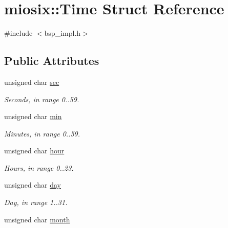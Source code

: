 \hypertarget{structmiosix_1_1_time}{\section{miosix\-:\-:Time Struct Reference}
\label{structmiosix_1_1_time}
}


{\ttfamily \#include $<$bsp\-\_\-impl.\-h$>$}

\subsection*{Public Attributes}
\begin{DoxyCompactItemize}
\item 
\hypertarget{structmiosix_1_1_time_a04df8f20000785df381311586aa3c3f1}{unsigned char \hyperlink{structmiosix_1_1_time_a04df8f20000785df381311586aa3c3f1}{sec}}\label{structmiosix_1_1_time_a04df8f20000785df381311586aa3c3f1}

\begin{DoxyCompactList}\small\item\em Seconds, in range 0..59. \end{DoxyCompactList}\item 
\hypertarget{structmiosix_1_1_time_a42a4aa9118e73cdc73685919e73a4299}{unsigned char \hyperlink{structmiosix_1_1_time_a42a4aa9118e73cdc73685919e73a4299}{min}}\label{structmiosix_1_1_time_a42a4aa9118e73cdc73685919e73a4299}

\begin{DoxyCompactList}\small\item\em Minutes, in range 0..59. \end{DoxyCompactList}\item 
\hypertarget{structmiosix_1_1_time_abf699a0aa658d1595f181420c88014ae}{unsigned char \hyperlink{structmiosix_1_1_time_abf699a0aa658d1595f181420c88014ae}{hour}}\label{structmiosix_1_1_time_abf699a0aa658d1595f181420c88014ae}

\begin{DoxyCompactList}\small\item\em Hours, in range 0..23. \end{DoxyCompactList}\item 
\hypertarget{structmiosix_1_1_time_a1876747788d5cc51d9e9b6e5c7cce14b}{unsigned char \hyperlink{structmiosix_1_1_time_a1876747788d5cc51d9e9b6e5c7cce14b}{day}}\label{structmiosix_1_1_time_a1876747788d5cc51d9e9b6e5c7cce14b}

\begin{DoxyCompactList}\small\item\em Day, in range 1..31. \end{DoxyCompactList}\item 
\hypertarget{structmiosix_1_1_time_ac5d8119e311cfef42508a8637678ab9d}{unsigned char \hyperlink{structmiosix_1_1_time_ac5d8119e311cfef42508a8637678ab9d}{month}}\label{structmiosix_1_1_time_ac5d8119e311cfef42508a8637678ab9d}


\end{DoxyCompactItemize}
